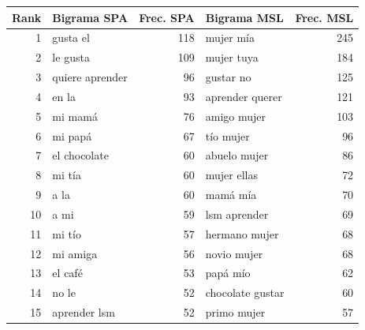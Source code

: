 \begin{tabular}{rlrlr}
\toprule
Rank & Bigrama SPA & Frec. SPA & Bigrama MSL & Frec. MSL \\
\midrule
1 & gusta el & 118 & mujer mía & 245 \\
2 & le gusta & 109 & mujer tuya & 184 \\
3 & quiere aprender & 96 & gustar no & 125 \\
4 & en la & 93 & aprender querer & 121 \\
5 & mi mamá & 76 & amigo mujer & 103 \\
6 & mi papá & 67 & tío mujer & 96 \\
7 & el chocolate & 60 & abuelo mujer & 86 \\
8 & mi tía & 60 & mujer ellas & 72 \\
9 & a la & 60 & mamá mía & 70 \\
10 & a mi & 59 & lsm aprender & 69 \\
11 & mi tío & 57 & hermano mujer & 68 \\
12 & mi amiga & 56 & novio mujer & 68 \\
13 & el café & 53 & papá mío & 62 \\
14 & no le & 52 & chocolate gustar & 60 \\
15 & aprender lsm & 52 & primo mujer & 57 \\
\bottomrule
\end{tabular}
